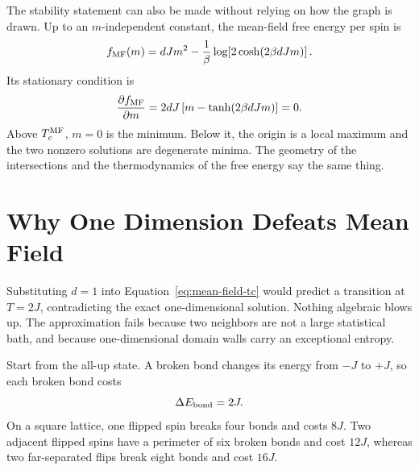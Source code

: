 The stability statement can also be made without relying on how the graph is drawn. Up to an \(m\)-independent constant, the mean-field free energy per spin is
\begin{equation}
f_{\rm MF}(m)
=dJm^2-\frac{1}{\beta}
\log\!\left[2\cosh(2\beta dJm)\right].
\label{eq:mf-free-energy}
\end{equation}
Its stationary condition is
\begin{equation}
\frac{\partial f_{\rm MF}}{\partial m}
=2dJ\left[m-\tanh(2\beta dJm)\right]=0.
\end{equation}
Above \(T_c^{\rm MF}\), \(m=0\) is the minimum. Below it, the origin is a local maximum and the two nonzero solutions are degenerate minima. The geometry of the intersections and the thermodynamics of the free energy say the same thing.

\begin{classroomqa}
\end{classroomqa}

\section{Why One Dimension Defeats Mean Field}

Substituting \(d=1\) into Equation~\eqref{eq:mean-field-tc} would predict a transition at \(T=2J\), contradicting the exact one-dimensional solution. Nothing algebraic blows up. The approximation fails because two neighbors are not a large statistical bath, and because one-dimensional domain walls carry an exceptional entropy.

Start from the all-up state. A broken bond changes its energy from \(-J\) to \(+J\), so each broken bond costs
\begin{equation}
\Delta E_{\rm bond}=2J.
\end{equation}
On a square lattice, one flipped spin breaks four bonds and costs \(8J\). Two adjacent flipped spins have a perimeter of six broken bonds and cost \(12J\), whereas two far-separated flips break eight bonds and cost \(16J\).

